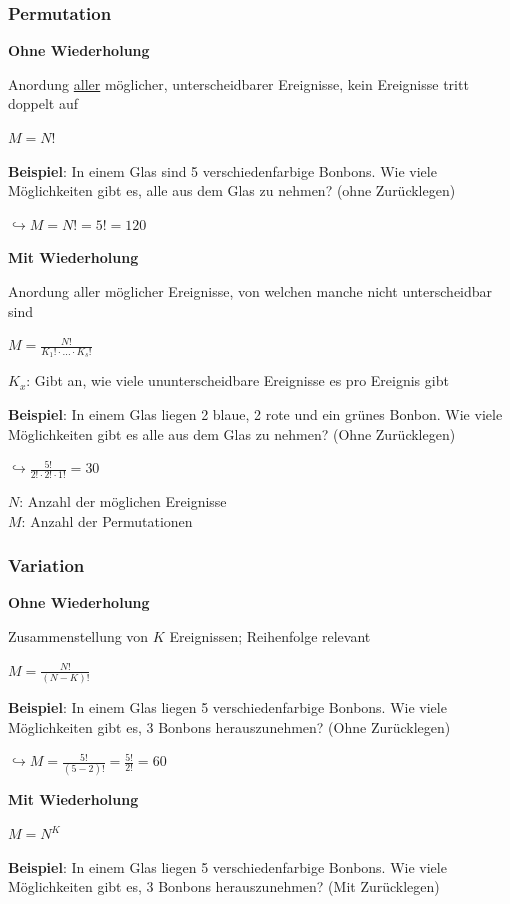 \subsubsection{Permutation}

\textbf{Ohne Wiederholung}

Anordung \underline{aller} möglicher, unterscheidbarer Ereignisse, kein Ereignisse tritt doppelt auf

$\displaystyle{
    M = N!
}$

\textbf{Beispiel}: In einem Glas sind 5 verschiedenfarbige Bonbons. Wie viele Möglichkeiten gibt es,
alle aus dem Glas zu nehmen? (ohne Zurücklegen)

$\hookrightarrow M = N! = 5! = 120$

\textbf{Mit Wiederholung}

Anordung aller möglicher Ereignisse, von welchen manche nicht unterscheidbar sind

$\displaystyle{
    M = \frac{N!}{K_1! \cdot ... \cdot K_s!}
}$

$K_x$: Gibt an, wie viele ununterscheidbare Ereignisse es pro Ereignis gibt

\textbf{Beispiel}: In einem Glas liegen 2 blaue, 2 rote und ein grünes Bonbon. Wie viele Möglichkeiten gibt es
alle aus dem Glas zu nehmen? (Ohne Zurücklegen)

$\displaystyle{
    \hookrightarrow \frac{5!}{2! \cdot 2! \cdot 1!} = 30
}$

$N$: Anzahl der möglichen Ereignisse\\
$M$: Anzahl der Permutationen

\subsubsection{Variation}

\textbf{Ohne Wiederholung}

Zusammenstellung von $K$ Ereignissen; Reihenfolge relevant

$\displaystyle{
    M = \frac{N!}{(N - K)!}
}$

\textbf{Beispiel}: In einem Glas liegen 5 verschiedenfarbige Bonbons. Wie viele Möglichkeiten gibt es, 3
Bonbons herauszunehmen? (Ohne Zurücklegen)

$\displaystyle{
    \hookrightarrow M = \frac{5!}{(5-2)!} = \frac{5!}{2!} = 60
}$

\textbf{Mit Wiederholung}

$\displaystyle{
    M = N^{K}
}$

\textbf{Beispiel}: In einem Glas liegen 5 verschiedenfarbige Bonbons. Wie viele Möglichkeiten gibt es, 3
Bonbons herauszunehmen? (Mit Zurücklegen)

